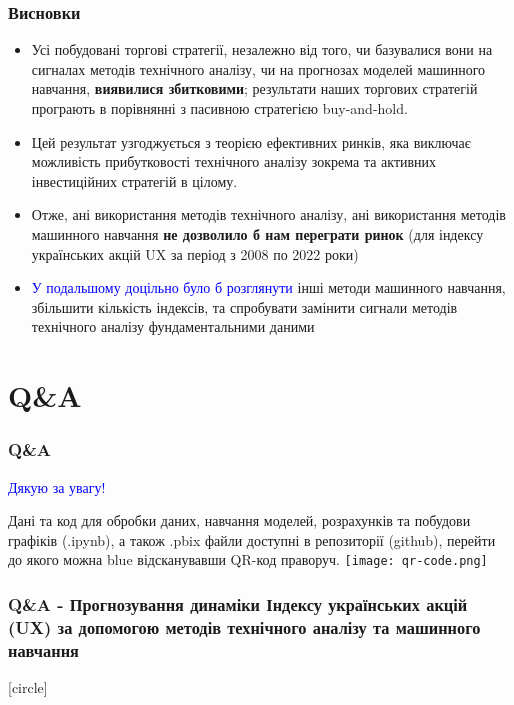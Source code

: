 \documentclass[aspectratio=169]{beamer}
\begin{document}
\begin{frame}
\frametitle{Висновки}
\begin{itemize}
\item Усі побудовані торгові стратегії, незалежно від того, чи базувалися вони на 
сигналах  методів  технічного  аналізу,  чи  на  прогнозах  моделей  машинного навчання, \alert {\textbf{виявилися збитковими}}; результати наших торгових стратегій програють в порівнянні з пасивною  стратегією  buy-and-hold.  
\bigskip
\item Цей  результат  узгоджується  з  теорією ефективних ринків, яка виключає можливість прибутковості технічного аналізу зокрема та активних інвестиційних стратегій в цілому.
\bigskip
\item Отже, ані використання методів технічного аналізу, ані використання методів машинного навчання \alert {\textbf{не дозволило б нам переграти ринок}} (для індексу українських акцій UX за період з 2008 по 2022 роки)
\bigskip
{}
\item \textcolor{blue} {У подальшому доцільно було б розглянути} інші  методи  машинного навчання, збільшити кількість індексів, та спробувати замінити сигнали  методів технічного  аналізу  фундаментальними даними
\bigskip
\end{itemize}
\end{frame}

\section{Q\&A}

\begin{frame}
\frametitle{Q\&A}
\begin{center}
\bigskip
\textcolor{blue}{\huge Дякую за увагу!} \\
\end{center}
\begin{multicols}{2}

\vbox{\vspace{0.8cm}}
Дані та код для обробки даних, навчання моделей, розрахунків та побудови графіків (.ipynb), а також .pbix файли доступні в репозиторії (github), перейти до якого можна {blue} {відсканувавши QR-код праворуч.}
\columnbreak
\hspace{5mm}
\texttt{[image: qr-code.png]}
\end{multicols}
\end{frame}

\begin{frame}
\frametitle {Q\&A - Прогнозування динаміки Індексу українських акцій (UX) за допомогою методів технічного аналізу та машинного навчання}
[circle]
\tableofcontents
\end{frame}
\end{document}

